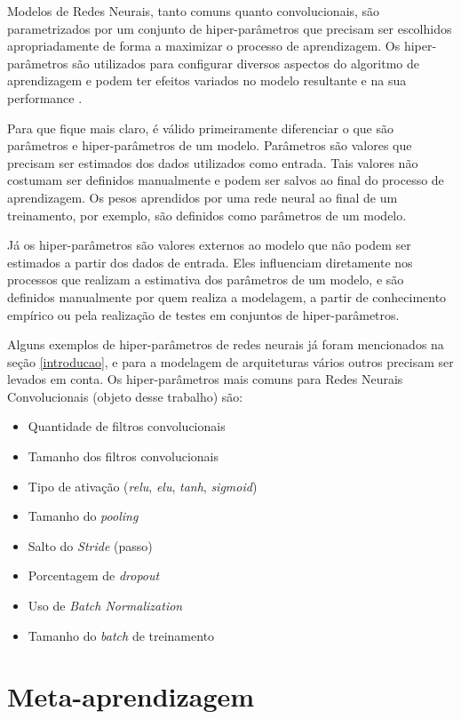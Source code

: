\documentclass[
12pt,       %
openright,      %
oneside,      %
a4paper,      %
english,      %
french,       %
spanish,      %
brazil        %
]{abntex2}
\begin{document}
Modelos de Redes Neurais, tanto comuns quanto convolucionais, são parametrizados por um conjunto de hiper-parâmetros que precisam ser escolhidos apropriadamente de forma a maximizar o processo de aprendizagem. Os hiper-parâmetros são utilizados para configurar diversos aspectos do algoritmo de aprendizagem e podem ter efeitos variados no modelo resultante e na sua performance \cite{ClaesenM15}.

Para que fique mais claro, é válido primeiramente diferenciar o que são parâmetros e hiper-parâmetros de um modelo. Parâmetros são valores que precisam ser estimados dos dados utilizados como entrada. Tais valores não costumam ser definidos manualmente e podem ser salvos ao final do processo de aprendizagem. Os pesos aprendidos por uma rede neural ao final de um treinamento, por exemplo, são definidos como parâmetros de um modelo.

Já os hiper-parâmetros são valores externos ao modelo que não podem ser estimados a partir dos dados de entrada. Eles influenciam diretamente nos processos que realizam a estimativa dos parâmetros de um modelo, e são definidos manualmente por quem realiza a modelagem, a partir de conhecimento empírico ou pela realização de testes em conjuntos de hiper-parâmetros.

Alguns exemplos de hiper-parâmetros de redes neurais já foram mencionados na seção \ref{introducao}, e para a modelagem de arquiteturas vários outros precisam ser levados em conta. Os hiper-parâmetros mais comuns para Redes Neurais Convolucionais (objeto desse trabalho) são:

\begin{itemize}
    \item Quantidade de filtros convolucionais
    \item Tamanho dos filtros convolucionais
    \item Tipo de ativação (\textit{relu}, \textit{elu}, \textit{tanh}, \textit{sigmoid})
    \item Tamanho do \textit{pooling}
    \item Salto do \textit{Stride} (passo)
    \item Porcentagem de \textit{dropout}
    \item Uso de \textit{Batch Normalization}
    \item Tamanho do \textit{batch} de treinamento
\end{itemize}

\section{Meta-aprendizagem} \label{metaaprendizagem}
\end{document}

